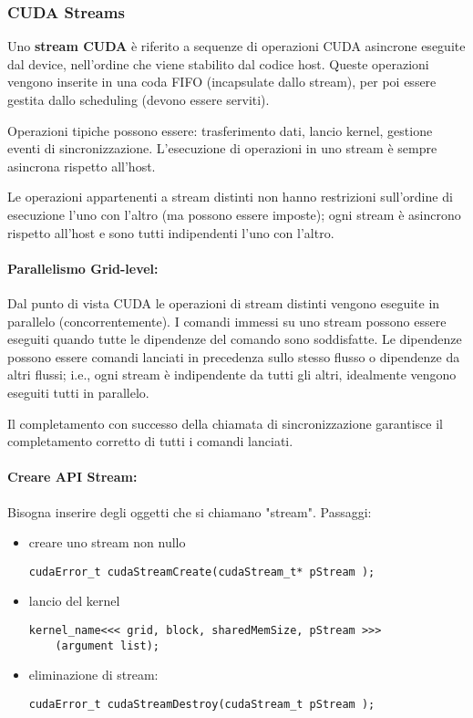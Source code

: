 \subsubsection{CUDA Streams}

Uno \textbf{stream CUDA} è riferito a sequenze di operazioni CUDA asincrone eseguite dal device, nell'ordine che viene stabilito dal codice host. Queste operazioni vengono inserite in una coda FIFO (incapsulate dallo stream), per poi essere gestita dallo scheduling (devono essere serviti). 

Operazioni tipiche possono essere: trasferimento dati, lancio kernel, gestione eventi di sincronizzazione. L'esecuzione di operazioni in uno stream è sempre asincrona rispetto all'host.

Le operazioni appartenenti a stream distinti non hanno restrizioni sull'ordine di esecuzione l'uno con l'altro (ma possono essere imposte); ogni stream è asincrono rispetto all'host e sono tutti indipendenti l'uno con l'altro.

\paragraph{Parallelismo Grid-level:} Dal punto di vista CUDA le operazioni di stream distinti vengono eseguite in parallelo (concorrentemente). I comandi immessi su uno stream possono essere eseguiti quando tutte le dipendenze del comando sono soddisfatte. Le dipendenze possono essere comandi lanciati in precedenza sullo stesso flusso o dipendenze da altri flussi; i.e., ogni stream è indipendente da tutti gli altri, idealmente vengono eseguiti tutti in parallelo.

Il completamento con successo della chiamata di sincronizzazione garantisce il completamento corretto di tutti i comandi lanciati.

\paragraph{Creare API Stream:} Bisogna inserire degli oggetti che si chiamano "stream". Passaggi: 
\begin{itemize}
	\item creare uno stream non nullo
	\begin{verbatim}
cudaError_t cudaStreamCreate(cudaStream_t* pStream );
	\end{verbatim}
	
	\item lancio del kernel
	\begin{verbatim}
kernel_name<<< grid, block, sharedMemSize, pStream >>>
    (argument list);
	\end{verbatim}
	
	\item eliminazione di stream:
	\begin{verbatim}
cudaError_t cudaStreamDestroy(cudaStream_t pStream );
	\end{verbatim}
\end{itemize}

